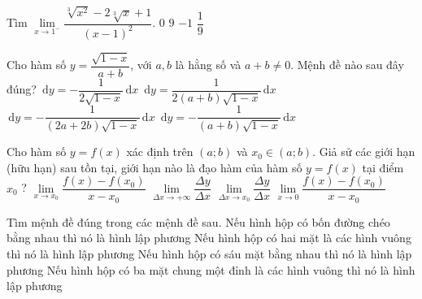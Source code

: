 \begin{ex}%
    Tìm $\lim\limits_{x\to 1^-} \dfrac{\sqrt[3]{x^2}-2\sqrt[3]{x}+1}{(x-1)^2}$.
    \choice
    {$0$}
    {$9$}
    {$-1$}
    {\True $\dfrac{1}{9}$}
\end{ex}

\begin{ex}%
    Cho hàm số $y=\dfrac{\sqrt{1-x}}{a+b}$, với $a,b$ là hằng số và $a+b\ne 0$. Mệnh đề nào sau đây đúng?
    \choice
    {$\mathrm{\,d}y=-\dfrac{1}{2\sqrt{1-x}} \mathrm{\,d}x$}
    {$\mathrm{\,d}y=\dfrac{1}{2(a+b)\sqrt{1-x}} \mathrm{\,d}x$}
    {\True $\mathrm{\,d}y=-\dfrac{1}{(2a+2b)\sqrt{1-x}} \mathrm{\,d}x$}
    {$\mathrm{\,d}y=-\dfrac{1}{(a+b)\sqrt{1-x}} \mathrm{\,d}x$}
\end{ex}

\begin{ex}%
    Cho hàm số $y=f(x)$ xác định trên $(a;b)$ và $x_0\in (a;b)$. Giả sử các giới hạn (hữu hạn) sau tồn tại, giới hạn nào là đạo hàm của hàm số $y=f(x)$ tại điểm $x_0$ ?
    \choice
    {\True $\lim\limits_{x\to x_0} \dfrac{f(x)-f(x_0)}{x-x_0}$}
    {$\lim\limits_{\Delta x\to +\infty} \dfrac{\Delta y}{\Delta x}$}
    {$\lim\limits_{\Delta x\to x_0} \dfrac{\Delta y}{\Delta x}$}
    {$\lim\limits_{x\to 0} \dfrac{f(x)-f(x_0)}{x-x_0}$}
\end{ex}

\begin{ex}%
    Tìm mệnh đề đúng trong các mệnh đề sau.
    \choice
    {Nếu hình hộp có bốn đường chéo bằng nhau thì nó là hình lập phương}
    {Nếu hình hộp có hai mặt là các hình vuông thì nó là hình lập phương}
    {Nếu hình hộp có sáu mặt bằng nhau thì nó là hình lập phương}
    {\True Nếu hình hộp có ba mặt chung một đỉnh là các hình vuông thì nó là hình lập phương}
\end{ex}

